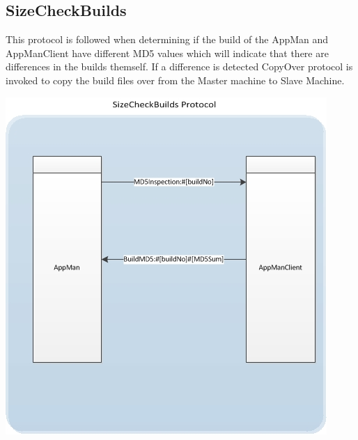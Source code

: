 \documentclass[a4paper,12pt,final]{article}
\begin{document}
\subsection{SizeCheckBuilds}
This protocol is followed when determining if the build of the AppMan and AppManClient have different MD5 values which will indicate that there are differences in the builds themself. If a difference is detected CopyOver protocol is invoked to copy the build files over from the Master machine to Slave Machine.
\begin{center}
\includegraphics[scale=1.0]{CommunicationProtocol/SizeCheckBuildsProtocol.jpg} 
\end{center}





\end{document}
